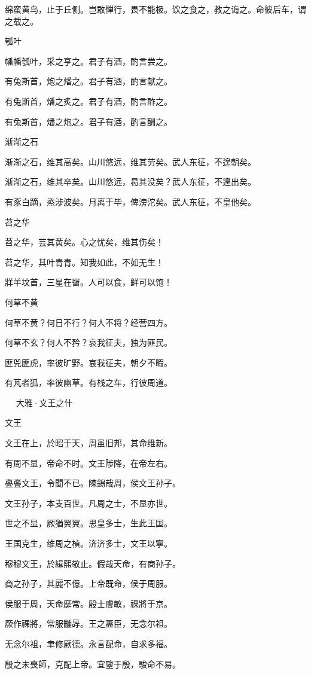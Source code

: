 绵蛮黄鸟，止于丘侧。岂敢惮行，畏不能极。饮之食之，教之诲之。命彼后车，谓之载之。

瓠叶

幡幡瓠叶，采之亨之。君子有酒，酌言尝之。

有兔斯首，炮之燔之。君子有酒，酌言献之。

有兔斯首，燔之炙之。君子有酒，酌言酢之。

有兔斯首，燔之炮之。君子有酒，酌言酬之。

渐渐之石

渐渐之石，维其高矣。山川悠远，维其劳矣。武人东征，不遑朝矣。

渐渐之石，维其卒矣。山川悠远，曷其没矣？武人东征，不遑出矣。

有豕白蹢，烝涉波矣。月离于毕，俾滂沱矣。武人东征，不皇他矣。

苕之华

苕之华，芸其黄矣。心之忧矣，维其伤矣！

苕之华，其叶青青。知我如此，不如无生！

牂羊坟首，三星在罶。人可以食，鲜可以饱！

何草不黄

何草不黄？何日不行？何人不将？经营四方。

何草不玄？何人不矜？哀我征夫，独为匪民。

匪兕匪虎，率彼旷野。哀我征夫，朝夕不暇。

有芃者狐，率彼幽草。有栈之车，行彼周道。



　
大雅·文王之什


文王

文王在上，於昭于天，周虽旧邦，其命维新。

有周不显，帝命不时。文王陟降，在帝左右。

亹亹文王，令聞不已。陳錫哉周，侯文王孙子。

文王孙子，本支百世。凡周之士，不显亦世。

世之不显，厥猶翼翼。思皇多士，生此王国。

王国克生，维周之楨。济济多士，文王以寧。

穆穆文王，於緝熙敬止。假哉天命，有商孙子。

商之孙子，其麗不億。上帝既命，侯于周服。

侯服于周，天命靡常。殷士膚敏，祼將于京。

厥作祼將，常服黼冔。王之藎臣，无念尔祖。

无念尔祖，聿修厥德。永言配命，自求多福。

殷之未喪師，克配上帝。宜鑒于殷，駿命不易。

